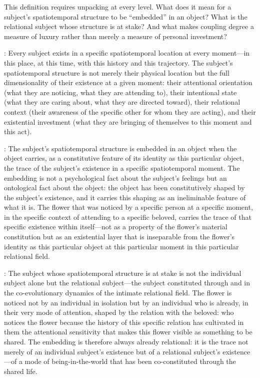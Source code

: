 This definition requires unpacking at every level. What does it mean for a subject's spatiotemporal structure to be ``embedded'' in an object? What is the relational subject whose structure is at stake? And what makes coupling degree a measure of luxury rather than merely a measure of personal investment?

: Every subject exists in a specific spatiotemporal location at every moment---in this place, at this time, with this history and this trajectory. The subject's spatiotemporal structure is not merely their physical location but the full dimensionality of their existence at a given moment: their attentional orientation (what they are noticing, what they are attending to), their intentional state (what they are caring about, what they are directed toward), their relational context (their awareness of the specific other for whom they are acting), and their existential investment (what they are bringing of themselves to this moment and this act).

: The subject's spatiotemporal structure is embedded in an object when the object carries, as a constitutive feature of its identity as this particular object, the trace of the subject's existence in a specific spatiotemporal moment. The embedding is not a psychological fact about the subject's feelings but an ontological fact about the object: the object has been constitutively shaped by the subject's existence, and it carries this shaping as an ineliminable feature of what it is. The flower that was noticed by a specific person at a specific moment, in the specific context of attending to a specific beloved, carries the trace of that specific existence within itself---not as a property of the flower's material constitution but as an existential layer that is inseparable from the flower's identity as this particular object at this particular moment in this particular relational field.

: The subject whose spatiotemporal structure is at stake is not the individual subject alone but the relational subject---the subject constituted through and in the co-evolutionary dynamics of the intimate relational field. The flower is noticed not by an individual in isolation but by an individual who is already, in their very mode of attention, shaped by the relation with the beloved: who notices the flower because the history of this specific relation has cultivated in them the attentional sensitivity that makes this flower visible as something to be shared. The embedding is therefore always already relational: it is the trace not merely of an individual subject's existence but of a relational subject's existence---of a mode of being-in-the-world that has been co-constituted through the shared life.


